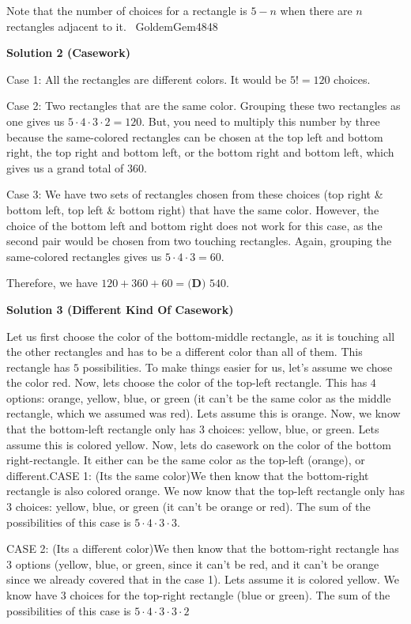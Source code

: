\begin{enumerate}
 Note that the number of choices for a rectangle is $5-n$ when there are $n$ rectangles adjacent to it. ~GoldemGem4848

 



\textbf{Solution 2 (Casework)}

Case 1: All the rectangles are different colors. It would be $5! = 120$ choices. 

 Case 2: Two rectangles that are the same color. Grouping these two rectangles as one gives us $5\cdot4\cdot3\cdot2 = 120$. But, you need to multiply this number by three because the same-colored rectangles can be chosen at the top left and bottom right, the top right and bottom left, or the bottom right and bottom left, which gives us a grand total of $360$.

 Case 3: We have two sets of rectangles chosen from these choices (top right & bottom left, top left & bottom right) that have the same color. However, the choice of the bottom left and bottom right does not work for this case, as the second pair would be chosen from two touching rectangles. Again, grouping the same-colored rectangles gives us $5\cdot4\cdot3 = 60$. 

 Therefore, we have $120 + 360 + 60 = \boxed{\textbf{(D) }540}$.

 



\textbf{Solution 3 (Different Kind Of Casework)}

Let us first choose the color of the bottom-middle rectangle, as it is touching all the other rectangles and has to be a different color than all of them. This rectangle has $5$ possibilities. To make things easier for us, let's assume we chose the color red. Now, lets choose the color of the top-left rectangle. This has $4$ options: orange, yellow, blue, or green (it can't be the same color as the middle rectangle, which we assumed was red). Lets assume this is orange. Now, we know that the bottom-left rectangle only has $3$ choices: yellow, blue, or green. Lets assume this is colored yellow. Now, lets do casework on the color of the bottom right-rectangle. It either can be the same color as the top-left (orange), or different.CASE 1: (Its the same color)We then know that the bottom-right rectangle is also colored orange. We now know that the top-left rectangle only has $3$ choices: yellow, blue, or green (it can't be orange or red). The sum of the possibilities of this case is $5\cdot4\cdot3\cdot3$.

 CASE 2: (Its a different color)We then know that the bottom-right rectangle has $3$ options (yellow, blue, or green, since it can't be red, and it can't be orange since we already covered that in the case 1). Lets assume it is colored yellow. We know have $3$ choices for the top-right rectangle (blue or green). The sum of the possibilities of this case is $5\cdot4\cdot3\cdot3\cdot2$


\end{enumerate}

